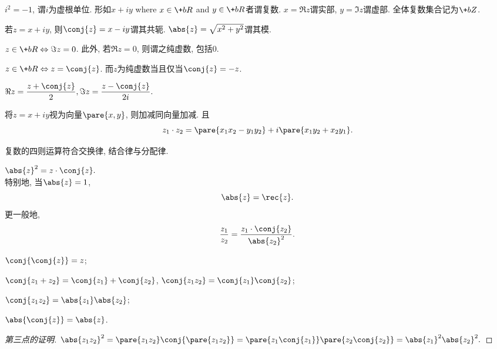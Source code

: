\documentclass{ctexart}
\begin{document}
\begin{definition}
    $i^2=-1$, 谓$i$为虚根单位. 形如$x+iy$ where $x\in \+bR$ and $y\in \+bR$者谓复数. $x=\Re z$谓实部, $y= \Im z$谓虚部. 全体复数集合记为$\+bZ$.\par
    若$z=x+iy$, 则$\conj{z}=x-iy$谓其共轭. $\abs{z} = \sqrt{x^2+y^2}$谓其模.
\end{definition}
\begin{lemma}
    $z\in\+bR\Leftrightarrow \Im z = 0$. 此外, 若$\Re z=0$, 则谓之纯虚数, 包括$0$.
\end{lemma}
\begin{lemma}
    \label{lem:实数或虚数的判断}
    $z\in\+bR\Leftrightarrow z=\conj{z}$. 而$z$为纯虚数当且仅当$\conj{z}=-z$.
\end{lemma}
\begin{lemma}
    $\displaystyle \Re z = \frac{z+\conj{z}}{2}, \Im z = \frac{z-\conj{z}}{2i}.$
\end{lemma}
\begin{definition}
    将$z=x+iy$视为向量$\pare{x,y}$, 则加减同向量加减. 且
    \[ z_1\cdot z_2 = \pare{x_1x_2-y_1y_2} + i\pare{x_1y_2 + x_2y_1}. \]
\end{definition}
\begin{lemma}
    复数的四则运算符合交换律, 结合律与分配律.
\end{lemma}
\begin{proposition}
    \hfill $\abs{z}^2 = z\cdot\conj{z}.$ \hfill\mbox{}\\
    特别地, 当$\abs{z} = 1$, 
    \[ \abs{z} = \rec{z}. \]
    更一般地,
    \[ \frac{z_1}{z_2} = \frac{z_1\cdot\conj{z_2}}{\abs{z_2}^2}. \]
\end{proposition}
\begin{proposition}[共轭的性质]\leavevmode
    \begin{cenum}
        \item $\conj{\conj{z}} = z$;
        \item $\conj{z_1+z_2} = \conj{z_1}+\conj{z_2}$, $\conj{z_1z_2} = \conj{z_1}\conj{z_2}$;
        \item $\conj{z_1z_2} = \abs{z_1}\abs{z_2}$;
        \item $\abs{\conj{z}} = \abs{z}$.
    \end{cenum}
\end{proposition}
\begin{proof}[第三点的证明]$\abs{z_1z_2}^2 = \pare{z_1z_2}\conj{\pare{z_1z_2}} = \pare{z_1\conj{z_1}}\pare{z_2\conj{z_2}} = \abs{z_1}^2\abs{z_2}^2.$
\end{proof}
\end{document}
